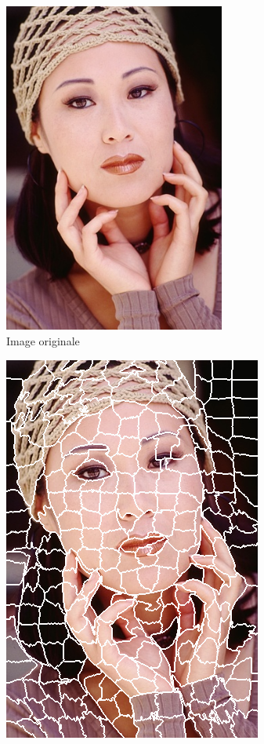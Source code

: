 \documentclass[12pt]{article}
\begin{document}
\begin{figure}
  \begin{subfigure}{0.48\textwidth}
    \centering
    \includegraphics[width=0.8\textwidth]{lady/lady.png}
    \caption{Image originale}
  \end{subfigure}
  \begin{subfigure}{0.48\textwidth}
    \centering
    \includegraphics[width=.8\textwidth]{lady/lady_segmented_256.png}

\end{subfigure}
\end{figure}
\end{document}
